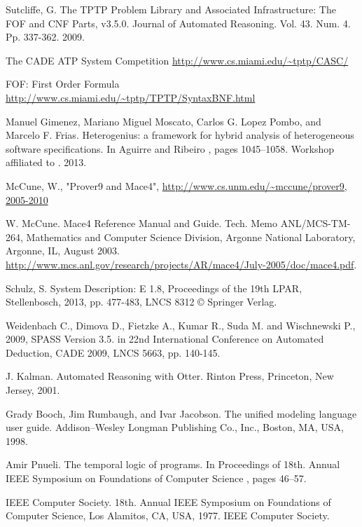 
\begin{thebibliography}{tesis}

	Sutcliffe, G. The TPTP Problem Library and Associated Infrastructure: The FOF and CNF Parts, v3.5.0. Journal of Automated Reasoning. Vol. 43. Num. 4. Pp. 337-362. 2009.

	The CADE ATP System Competition
	\url{http://www.cs.miami.edu/~tptp/CASC/}

	FOF: First Order Formula
	\url{http://www.cs.miami.edu/~tptp/TPTP/SyntaxBNF.html}

	Manuel Gimenez, Mariano Miguel Moscato, Carlos G. Lopez Pombo, and Marcelo F. Frias. Heterogenius: a framework for hybrid analysis of heterogeneous software specifications. In Aguirre and Ribeiro \cite{AR13}, pages 1045–1058. Workshop affiliated to \cite{DM13}. 2013.
	
	McCune, W., "Prover9 and Mace4", \url{http://www.cs.unm.edu/~mccune/prover9, 2005-2010}

	W. McCune. Mace4 Reference Manual and Guide. Tech. Memo ANL/MCS-TM-264, Mathematics and Computer Science Division, Argonne National Laboratory, Argonne, IL, August 2003.
    \url{http://www.mcs.anl.gov/research/projects/AR/mace4/July-2005/doc/mace4.pdf}.

  Schulz, S. System Description: E 1.8, Proceedings of the 19th LPAR, Stellenbosch, 2013, pp. 477-483, LNCS 8312 © Springer Verlag.

 Weidenbach C., Dimova D., Fietzke A., Kumar R., Suda M. and Wischnewski P., 2009, SPASS Version 3.5. in 22nd International Conference on Automated Deduction, CADE 2009, LNCS 5663, pp. 140-145.

 J. Kalman. Automated Reasoning with Otter. Rinton Press, Princeton, New Jersey,
2001.

 Grady Booch, Jim Rumbaugh, and Ivar Jacobson. The unified modeling language user guide. Addison–Wesley Longman Publishing Co., Inc., Boston, MA, USA, 1998.

 Amir Pnueli. The temporal logic of programs. In Proceedings of 18th. Annual IEEE Symposium on Foundations of Computer Science \cite{IEE77}, pages 46–57. 

 IEEE Computer Society. 18th. Annual IEEE Symposium on Foundations of Computer Science, Los Alamitos, CA, USA, 1977. IEEE Computer Society. 


\end{thebibliography}
